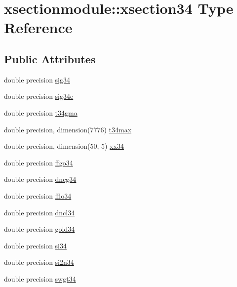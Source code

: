 \hypertarget{structxsectionmodule_1_1xsection34}{}\section{xsectionmodule\+:\+:xsection34 Type Reference}
\label{structxsectionmodule_1_1xsection34}
\subsection*{Public Attributes}
\begin{DoxyCompactItemize}
\item 
double precision \hyperlink{structxsectionmodule_1_1xsection34_ae712f776a1438c49669e07d7023e875e}{sig34}
\item 
double precision \hyperlink{structxsectionmodule_1_1xsection34_ace9a463c9ef1ed7765fb41af8ac638ce}{sig34e}
\item 
double precision \hyperlink{structxsectionmodule_1_1xsection34_a32e33ab1fe20c6ff3e898e7570da740f}{t34gma}
\item 
double precision, dimension(7776) \hyperlink{structxsectionmodule_1_1xsection34_aa09a315e55e5bc623ec5373dafe11469}{t34max}
\item 
double precision, dimension(50, 5) \hyperlink{structxsectionmodule_1_1xsection34_a4d07a759505f32b6218c6bbe016490cf}{xx34}
\item 
double precision \hyperlink{structxsectionmodule_1_1xsection34_a5b561c4084f0bf1bb68ef3a2f6608460}{ffgo34}
\item 
double precision \hyperlink{structxsectionmodule_1_1xsection34_a080249ff8b9a05657573a8ef261648f7}{dncg34}
\item 
double precision \hyperlink{structxsectionmodule_1_1xsection34_a8e11ab07256fa867fe177533c13bf943}{fflo34}
\item 
double precision \hyperlink{structxsectionmodule_1_1xsection34_a92026a5ea24d74df6384972fcb4deb7a}{dncl34}
\item 
double precision \hyperlink{structxsectionmodule_1_1xsection34_a359ebee8292ffbc76697e16217740ae5}{gold34}
\item 
double precision \hyperlink{structxsectionmodule_1_1xsection34_a0b5be20713c67da8581277956ff07de9}{si34}
\item 
double precision \hyperlink{structxsectionmodule_1_1xsection34_aa3df5b0850f9e44feea6f47b84fe80c0}{si2n34}
\item 
double precision \hyperlink{structxsectionmodule_1_1xsection34_a2ea2b97fdcde9966e6a508b5bde05781}{swgt34}

\end{DoxyCompactItemize}
